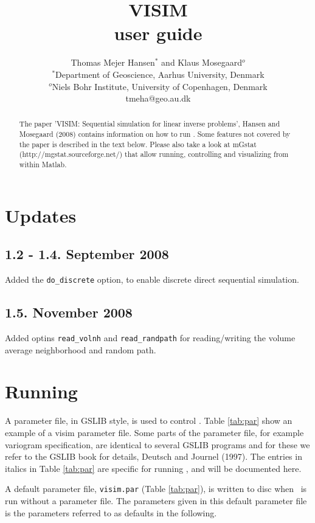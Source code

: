 \documentclass[12t]{article}
\title{VISIM\\user guide}
\author{Thomas Mejer Hansen$^*$ and Klaus Mosegaard$^o$\\
$^*$Department of Geoscience, Aarhus University, Denmark\\
$^o$Niels Bohr Institute, University of Copenhagen, Denmark\\
tmeha@geo.au.dk}
\begin{document}
\maketitle

\begin{abstract}
The paper 'VISIM: Sequential simulation for linear inverse problems', Hansen and Mosegaard (2008) contains information on how to run \visimprog. Some features not covered by the paper is described in the text below. Please also take a look at mGstat (http://mgstat.sourceforge.net/) that allow running, controlling and visualizing \visimprog from within Matlab.
\end{abstract}


\section{Updates}
\subsection{1.2 - 1.4. September 2008}
Added the \texttt{do\_discrete} option, to enable discrete direct sequential simulation.

\subsection{1.5. November 2008}
Added optins \texttt{read\_volnh} and \texttt{read\_randpath} for reading/writing the volume average neighborhood and random path.



\section{Running \visimprog}
\label{sec:running}
A parameter file, in GSLIB style, is used to control \visimprog. Table
\ref{tab:par} show an example of a visim parameter file. Some parts of
the parameter file, for example variogram specification, are identical
to several GSLIB programs and for these we refer to the GSLIB book for
details, Deutsch and Journel (1997). 
The entries in italics in Table \ref{tab:par} are specific for running \visimprog, and will be documented here.

A default parameter file, \texttt{visim.par} (Table \ref{tab:par}), is written to disc when
\visimprog~is run without a parameter file. The parameters given in this default parameter file is the parameters referred to as defaults in the following.
\end{document}

